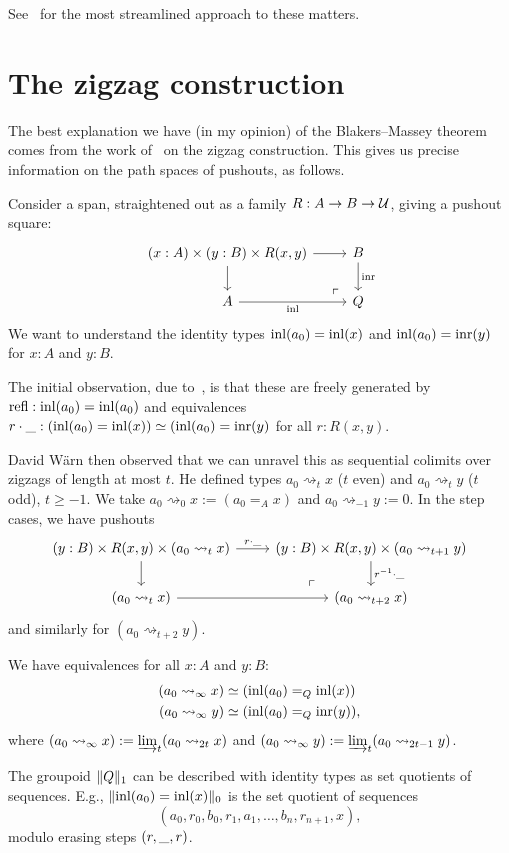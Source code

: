 \documentclass[10pt,oneside,leqno,openright]{memoir}
\newcommand*{\sto}{\rightsquigarrow}
\begin{document}
See~\textcite{ABFJ-BM} for the most streamlined approach to these matters.

\section{The zigzag construction}

The best explanation we have (in my opinion) of the Blakers--Massey theorem
comes from the work of~\textcite{Warn2024} on the zigzag construction.
This gives us precise information on the path spaces of pushouts, as follows.

Consider a span, straightened out as a family $R : A \to B \to \mathcal{U}$, giving a pushout square:
\[
  \begin{tikzcd}
    (x:A)\times(y:B)\times R(x,y) \ar[r]\ar[d]\pocorner & B\ar[d,"{\inr}"] \\
    A \ar[r,"{\inl}"'] & Q
  \end{tikzcd}
\]
We want to understand the identity types $\operatorname{inl}(a_0) = \operatorname{inl}(x)$ and
$\operatorname{inl}(a_0) = \operatorname{inr}(y)$ for $x:A$ and $y:B$.

The initial observation, due to~\textcite{Kraus-vonRaumer}, is that these are
freely generated by $\mathrm{refl} : \operatorname{inl}(a_0) = \operatorname{inl}(a_0)$ and equivalences
$r\cdot\_ : (\operatorname{inl}(a_0) = \operatorname{inl}(x)) \simeq (\operatorname{inl}(a_0) = \operatorname{inr}(y)$ for all
$r:R(x,y)$.

David Wärn then observed that we can unravel this as sequential colimits over
zigzags of length at most $t$.
He defined types $a_0 \sto_t x$ ($t$ even) and $a_0 \sto_t y$ ($t$ odd), $t\ge-1$.
We take $a_0 \sto_0 x := (a_0 =_A x)$ and $a_0 \sto_{-1} y := 0$. In the step cases, we have pushouts
\[
  \begin{tikzcd}
    (y:B)\times R(x,y)\times(a_0\sto_t x) \ar[r,"r\cdot\blank"]\ar[d]\pocorner &
    (y:B)\times R(x,y)\times(a_0\sto_{t+1} y)\ar[d,"r^{-1}\cdot\blank"] \\
    (a_0 \sto_t x) \ar[r] & (a_0 \sto_{t+2} x)
  \end{tikzcd}
\]
and similarly for $(a_0 \sto_{t+2} y)$.
\begin{theorem}[Wärn]
  We have equivalences for all $x:A$ and $y:B$:
  \begin{align*}
    (a_0 \sto_\infty x) &\simeq (\inl(a_0) =_Q \inl(x)) \\
    (a_0 \sto_\infty y) &\simeq (\inl(a_0) =_Q \inr(y)),
  \end{align*}
  where $(a_0 \sto_\infty x) := \varinjlim_t (a_0 \sto_{2t} x)$ and
  $(a_0 \sto_\infty y) := \varinjlim_t (a_0 \sto_{2t-1} y)$.
\end{theorem}
\begin{corollary}
  The groupoid $\lVert Q\rVert_1$ can be described with identity types as set quotients of sequences.
  E.g., $\lVert\operatorname{inl}(a_0)=\operatorname{inl}(x)\rVert_0$ is the set quotient of
  sequences
  \[(a_0,r_0,b_0,r_1,a_1,\ldots,b_n,r_{n+1},x),\]
  modulo erasing steps $(r,\_,r)$.
\end{corollary}
\end{document}
